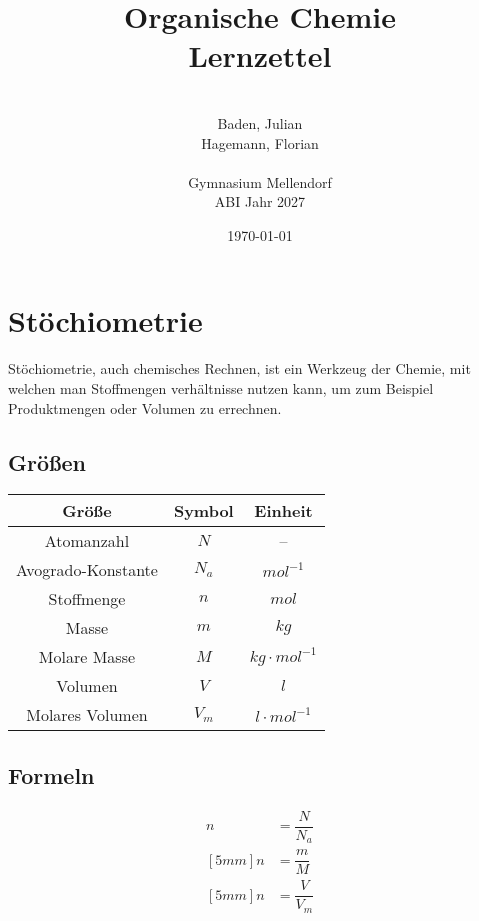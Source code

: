 \documentclass[a4paper]{article}
\title{\Huge{Organische Chemie\\Lernzettel}}
\date{\today}
\author{\quad\\Baden, Julian\\Hagemann, Florian\\\\Gymnasium Mellendorf\\ABI Jahr 2027}
\begin{document}
\maketitle
\thispagestyle{empty}
\newpage
\tableofcontents \thispagestyle{empty}
\newpage
{}




\section{Stöchiometrie}
Stöchiometrie, auch chemisches Rechnen, ist ein Werkzeug der Chemie, mit welchen man Stoffmengen verhältnisse
nutzen kann, um zum Beispiel Produktmengen oder Volumen zu errechnen.
\subsection{Größen}
\begin{center}
\begin{tabular}{|c|c|c|}
    \hline
    Größe       &Symbol     &Einheit \\\hline
    Atomanzahl  &$N$        &-- \\ 
    Avogrado-Konstante &$N_a$ &$mol^{-1}$ \\
    Stoffmenge &$n$ &$mol$ \\
    Masse &$m$ &$kg$ \\
    Molare Masse &$M$ &$kg \cdot mol^{-1}$ \\
    Volumen &$V$ &$l$ \\
    Molares Volumen &$V_m$ &$l \cdot mol^{-1}$\\ \hline
\end{tabular}
\end{center}

\subsection{Formeln}
\Large
\begin{eqnarray*}
    n &= \dfrac{N}{N_a} \\ [5mm]
    n &= \dfrac{m}{M} \\ [5mm]
    n &= \dfrac{V}{V_m}
\end{eqnarray*}
\normalsize
\end{document}
